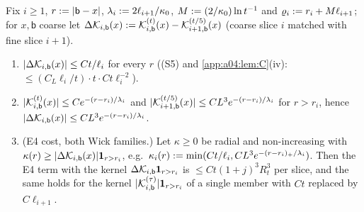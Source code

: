 \begin{lemma}\label{app:a04:lem:T}
Fix $i\ge1$, $r:=|\mathsf b-x|$, $\lambda_i:=2\ell_{i+1}/\kappa_0$, $M:=(2/\kappa_0)\ln t^{-1}$ and $\varrho_i:= r_i+M\ell_{i+1}$; for $x,\mathsf b$ coarse let $\Delta\mathcal K_{i,\mathsf b}(x):=\mathcal K^{(t)}_{i,\mathsf b}(x)-\mathcal K^{(t/5)}_{i+1,\mathsf b}(x)$ (coarse slice $i$ matched with fine slice $i+1$).
\begin{enumerate}[label=\textup{(T\arabic*)},leftmargin=*]
\item $|\Delta\mathcal K_{i,\mathsf b}(x)|\le Ct/\ell_i$ for every $r$ ((S5) and \cref{app:a04:lem:C}(iv): $\le(C_L\ell_i/t)\cdot t\cdot Ct\ell_i^{-2}$).
\item $|\mathcal K^{(t)}_{i,\mathsf b}(x)|\le Ce^{-(r-r_i)/\lambda_i}$ and $|\mathcal K^{(t/5)}_{i+1,\mathsf b}(x)|\le CL^3e^{-(r-r_i)/\lambda_i}$ for $r>r_i$, hence $|\Delta\mathcal K_{i,\mathsf b}(x)|\le CL^3e^{-(r-r_i)/\lambda_i}$.
\item (E4 cost, both Wick families.) Let $\kappa\ge0$ be radial and non-increasing with $\kappa(r)\ge|\Delta\mathcal K_{i,\mathsf b}(x)|\mathbf 1_{r>r_i}$, e.g.\ $\kappa_i(r):=\min(Ct/\ell_i,CL^3e^{-(r-r_i)_+/\lambda_i})$. Then the E4 term with the kernel $\Delta\mathcal K_{i,\mathsf b}\mathbf 1_{r>r_i}$ is $\le Ct(1+j)^3R_t^3$ per slice, and the same holds for the kernel $|\mathcal K^{(\tau)}_{i,\mathsf b}|\mathbf 1_{r>r_i}$ of a single member with $Ct$ replaced by $C\ell_{i+1}$.
\end{enumerate}
\end{lemma}
